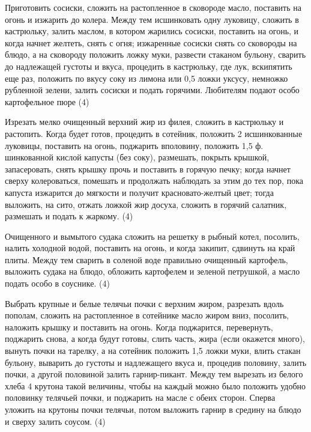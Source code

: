 
Приготовить сосиски, сложить на растопленное в сковороде масло, поставить на огонь и изжарить до колера. Между тем исшинковать одну луковицу, сложить в кастрюльку, залить маслом, в котором жарились сосиски, поставить на огонь, и когда начнет желтеть, снять с огня; изжаренные сосиски снять со сковороды на блюдо, а на сковороду положить ложку муки, развести стаканом бульону, сварить до надлежащей густоты и вкуса, процедить в кастрюльку, где лук, вскипятить еще раз, положить по вкусу соку из лимона или 0,5 ложки уксусу, немножко рубленной зелени, залить сосиски и подать горячими. Любителям подают особо картофельное пюре (4) 


Изрезать мелко очищенный верхний жир из филея, сложить в кастрюльку и растопить. Когда будет готов, процедить в сотейник, положить 2 исшинкованные луковицы, поставить на огонь, поджарить вполовину, положить 1,5 ф. шинкованной кислой капусты (без соку), размешать, покрыть крышкой, запасеровать, снять крышку прочь и поставить в горячую печку; когда начнет сверху колероваться, помешать и продолжать наблюдать за этим до тех пор, пока капуста изжарится до мягкости и получит красновато-желтый цвет; тогда выложить, на сито, отжать ложкой жир досуха, сложить в горячий салатник, размешать и подать к жаркому. (4) 


Очищенного и вымытого судака сложить на решетку в рыбный котел, посолить, налить холодной водой, поставить на огонь, и когда закипит, сдвинуть на край плиты. Между тем сварить в соленой воде правильно очищенный картофель, выложить судака на блюдо, обложить картофелем и зеленой петрушкой, а масло подать особо в соуснике. (4) 


Выбрать крупные и белые телячьи почки с верхним жиром, разрезать вдоль пополам, сложить на растопленное в сотейнике масло жиром вниз, посолить, наложить крышку и поставить на огонь. Когда поджарится, перевернуть, поджарить снова, а когда будут готовы, слить часть, жира (если окажется много), вынуть почки на тарелку, а на сотейник положить 1,5 ложки муки, влить стакан бульону, выварить до густоты и надлежащего вкуса и, процедив половину, залить почки, а другой половиной залить гарнир-пикант. Между тем вырезать из белого хлеба 4 крутона такой величины, чтобы на каждый можно было положить удобно половинку телячьей почки, и поджарить на масле с обеих сторон. Сперва уложить на крутоны почки телячьи, потом выложить гарнир в средину на блюдо и сверху залить соусом. (4) 

